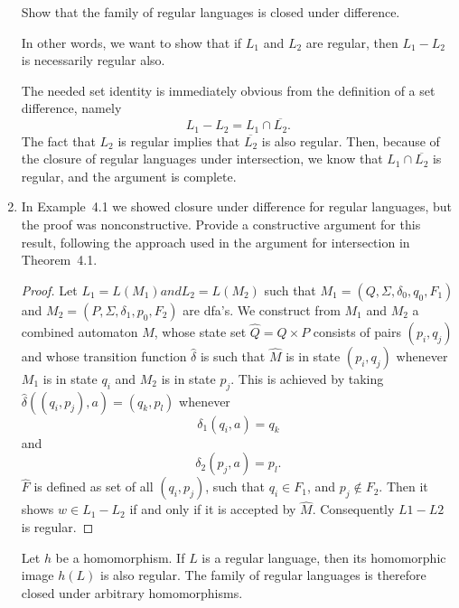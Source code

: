 \documentclass[]{article}
\theoremstyle{definition}
\newenvironment{thm}[1]
  {\renewcommand\theinnercustomtheorem{#1}\innercustomtheorem}
  {\endinnercustomtheorem}
\newenvironment{ex}[1]
  {\renewcommand\theinnercustomexample{#1}\innercustomexample}
  {\endinnercustomexample}
\begin{document}
\begin{enumerate}
    \begin{ex}{4.1}
        Show that the family of regular languages is closed under difference.

        In other words, we want to show that if $L_1$ and $L_2$ are regular,
        then $L_1 - L_2$ is necessarily regular also. \par
        The needed set identity is immediately obvious from the definition of a set
        difference, namely $$L_1 - L_2 = L_1 \cap \overline{L_2}.$$
        The fact that $L_2$ is regular implies that $\overline{L_2}$ is also regular.
        Then, because of the closure of regular languages under intersection,
        we know that $L_1 \cap \overline{L_2}$ is regular, and the argument is complete.
    \end{ex}
    
\item 
    In Example~4.1 we showed closure under difference for regular languages,
    but the proof was nonconstructive. Provide a constructive argument for this result,
    following the approach used in the argument for intersection in Theorem~4.1.
    
    \begin{proof}
        Let $L_1 = L(M_1) and L_2 = L(M_2)$ such that $M_1 = (Q, \Sigma, \delta_0, q_0, F_1)$ and
        $M_2 = (P, \Sigma, \delta_1, p_0, F_2)$ are dfa's. We construct from $M_1$ and $M_2$
        a combined automaton $\hat{M}$, whose state set $\hat{Q} = Q \times P$ consists of
        pairs $(p_i, q_j)$ and whose transition function $\hat{\delta}$ is such that $\hat{M}$ is
        in state $(p_i, q_j)$ whenever $M_1$ is in state $q_i$ and $M_2$ is in state $p_j$.
        This is achieved by taking $\hat{\delta}((q_i, p_j), a) = (q_k, p_l)$ whenever
            $$\delta_1(q_i, a) = q_k$$ and
            $$\delta_2(p_j, a) = p_l.$$
        $\hat{F}$ is defined as set of all $(q_i, p_j)$, such that $q_i \in F_1$, and
        $p_j \notin F_2$. Then it shows $w \in L_1 - L_2$ if and only if it is accepted by
        $\hat{M}$. Consequently $L1 - L2$ is regular.
    \end{proof}

\begin{thm}{4.3}
    Let $h$ be a homomorphism. If $L$ is a regular language, then its homomorphic image
    $h(L)$ is also regular. The family of regular languages is therefore closed under
    arbitrary homomorphisms.
    

\end{thm}
\end{enumerate}
\end{document}
